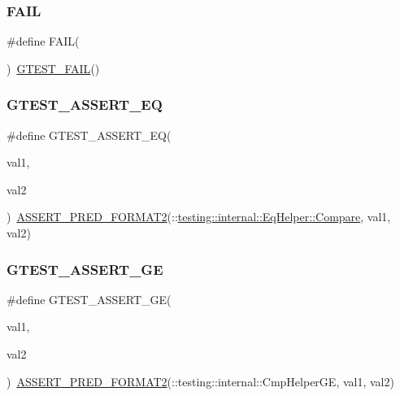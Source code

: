 \subsubsection{\texorpdfstring{FAIL}{FAIL}}
{\footnotesize\ttfamily \#define F\+A\+IL(\begin{DoxyParamCaption}{ }\end{DoxyParamCaption})~\mbox{\hyperlink{_obj__test_2lib_2googletest-release-1_88_81_2googletest_2include_2gtest_2gtest_8h_a636231436707c30d6778f79ae96f5dc6}{G\+T\+E\+S\+T\+\_\+\+F\+A\+IL}}()}

\mbox{\label{_obj__test_2lib_2googletest-master_2googletest_2include_2gtest_2gtest_8h_a8a7a47387090810cdfe78933d348182d}} 
\subsubsection{\texorpdfstring{GTEST\_ASSERT\_EQ}{GTEST\_ASSERT\_EQ}}
{\footnotesize\ttfamily \#define G\+T\+E\+S\+T\+\_\+\+A\+S\+S\+E\+R\+T\+\_\+\+EQ(\begin{DoxyParamCaption}\item[{}]{val1,  }\item[{}]{val2 }\end{DoxyParamCaption})~\mbox{\hyperlink{_obj__test_2lib_2googletest-release-1_88_81_2googletest_2include_2gtest_2gtest__pred__impl_8h_ac452685a1a98ea3d96eb956a062ee210}{A\+S\+S\+E\+R\+T\+\_\+\+P\+R\+E\+D\+\_\+\+F\+O\+R\+M\+A\+T2}}(\+::\mbox{\hyperlink{classtesting_1_1internal_1_1_eq_helper_a14dd80457029c1ab4a4d04f20003d237}{testing\+::internal\+::\+Eq\+Helper\+::\+Compare}}, val1, val2)}

\mbox{\label{_obj__test_2lib_2googletest-master_2googletest_2include_2gtest_2gtest_8h_a55373d99c079ff1b894e2eb5bcd15c5a}} 
\subsubsection{\texorpdfstring{GTEST\_ASSERT\_GE}{GTEST\_ASSERT\_GE}}
{\footnotesize\ttfamily \#define G\+T\+E\+S\+T\+\_\+\+A\+S\+S\+E\+R\+T\+\_\+\+GE(\begin{DoxyParamCaption}\item[{}]{val1,  }\item[{}]{val2 }\end{DoxyParamCaption})~\mbox{\hyperlink{_obj__test_2lib_2googletest-release-1_88_81_2googletest_2include_2gtest_2gtest__pred__impl_8h_ac452685a1a98ea3d96eb956a062ee210}{A\+S\+S\+E\+R\+T\+\_\+\+P\+R\+E\+D\+\_\+\+F\+O\+R\+M\+A\+T2}}(\+::testing\+::internal\+::\+Cmp\+Helper\+GE, val1, val2)}

